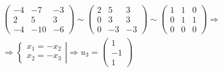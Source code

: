 \documentclass[12pt]{article}
\begin{document}
\begin{sloppypar}
    \begin{align*}
         & \begin{pmatrix}
               -4 & -7  & -3 \\
               2  & 5   & 3  \\
               -4 & -10 & -6
           \end{pmatrix}
        \sim
        \begin{pmatrix}
            2 & 5  & 3  \\
            0 & 3  & 3  \\
            0 & -3 & -3
        \end{pmatrix}
        \sim
        \begin{pmatrix}
            1 & 1 & 0 \\
            0 & 1 & 1 \\
            0 & 0 & 0
        \end{pmatrix}
        \Rightarrow       \\
         & \Rightarrow
        \left.\begin{cases}
                  x_1 = -x_2 \\
                  x_2 = -x_3
              \end{cases}\right|
        \Rightarrow
        u_3 = \begin{pmatrix}
                  1 \\ -1 \\ 1
              \end{pmatrix}
    \end{align*}




\end{sloppypar}
\end{document}
